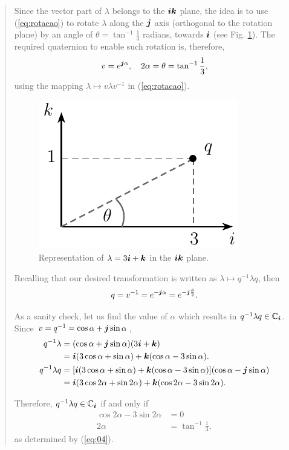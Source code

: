 \begin{quotation}
\begin{example}
Since the vector part of $\lambda$ belongs to the $ \boldsymbol{i} \boldsymbol{k} $ plane, the idea is to use (\ref{eq:rotacao}) to rotate $\lambda$ along the $\boldsymbol{j}$ axis (orthogonal to the rotation plane) by an angle of $ \theta = \tan^{-1} \frac{1}{3} $ radians, towards $ \boldsymbol{i} $ (see Fig. \ref{fig:quat3ik}). The required quaternion to enable such rotation is, therefore,
\begin{equation}
\label{eq:04}
v = e^{\boldsymbol{j} \alpha}, \quad 2\alpha = \theta = \tan^{-1} \frac{1}{3},
\end{equation}
using the mapping $ \lambda \mapsto v \lambda v^{-1} $ in (\ref{eq:rotacao}).

\begin{figure}
\centering
\includegraphics[width=0.25\linewidth]{Figures/quaternion01.pdf}
\caption{Representation of $ \lambda = 3\boldsymbol{i} + \boldsymbol{k} $ in the $ \boldsymbol{i} \boldsymbol{k} $ plane.}
\label{fig:quat3ik}
\end{figure}

Recalling that our desired transformation is written as $ \lambda \mapsto q^{-1} \lambda q $, then
\begin{equation}
q = v^{-1} = e^{- \boldsymbol{j} \alpha} = e^{- \boldsymbol{j} \frac{\theta}{2}}.
\end{equation}

As a sanity check, let us find the value of $ \alpha $ which results in $ q^{-1} \lambda q \in \mathbb{C}_{\boldsymbol{i}} $. Since $ v = q^{-1} = \cos \alpha + \boldsymbol{j} \sin \alpha $,
\begin{equation}
\begin{aligned}
q^{-1} \lambda &= (\cos \alpha + \boldsymbol{j} \sin \alpha)(3 \boldsymbol{i} + \boldsymbol{k})\\
&= \boldsymbol{i}(3 \cos \alpha + \sin \alpha) + \boldsymbol{k}(\cos \alpha - 3 \sin \alpha). \\
q^{-1} \lambda q &= [\boldsymbol{i}(3 \cos \alpha + \sin \alpha) + \boldsymbol{k}(\cos \alpha - 3 \sin \alpha)] (\cos \alpha - \boldsymbol{j} \sin \alpha) \\
&= \boldsymbol{i} (3 \cos 2\alpha + \sin 2\alpha) + \boldsymbol{k}(\cos 2\alpha - 3 \sin 2\alpha).
\end{aligned}
\end{equation}

Therefore, $ q^{-1} \lambda q \in \mathbb{C}_{\boldsymbol{i}} $ if and only if
\begin{equation}
\begin{aligned}\textbf{}
\cos 2\alpha - 3 \sin 2\alpha &= 0 \\
2\alpha &= \tan^{-1} \frac{1}{3},
\end{aligned}
\end{equation}
as determined by (\ref{eq:04}).


\end{example}
\end{quotation}
